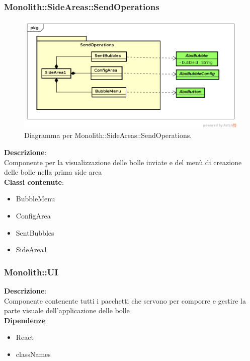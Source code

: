 \subsubsection{Monolith::SideAreas::SendOperations}
   \FloatBarrier
   \begin{figure}[ht]
   \centering
\includegraphics[width=\textwidth,keepaspectratio]{img/sd1_pkg}
   \caption{Diagramma per Monolith::SideAreas::SendOperations.}
\end{figure}
\FloatBarrier
\textbf{Descrizione}:\\
 Componente per la visualizzazione delle bolle inviate e del menù di creazione delle bolle nella prima side area 
\\ \textbf{Classi contenute}:\\
\begin{itemize}
\item BubbleMenu
\item ConfigArea
\item SentBubbles
\item SideArea1
\end{itemize}


\clearpage

\subsubsection{Monolith::UI}
\textbf{Descrizione}:\\
 Componente contenente tutti i pacchetti che servono per comporre e gestire la parte visuale dell'applicazione delle bolle \\
\textbf{Dipendenze}
\begin{itemize}
\item React
\item classNames
\end{itemize} 


\clearpage

